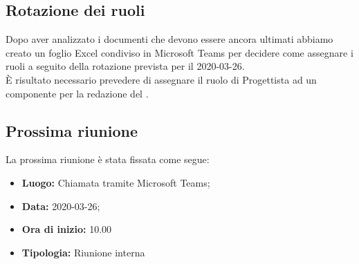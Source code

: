 	\subsection{Rotazione dei ruoli}
		Dopo aver analizzato i documenti che devono essere ancora ultimati abbiamo creato un foglio Excel condiviso in Microsoft Teams per decidere come assegnare i ruoli a seguito della rotazione prevista per il 2020-03-26. \\
		È risultato necessario prevedere di assegnare il ruolo di Progettista ad un componente per la redazione del \PdQ.

	\subsection{Prossima riunione}
		La prossima riunione è stata fissata come segue: 
		\begin{itemize}
			\item \textbf{Luogo: } Chiamata tramite Microsoft Teams; 
			\item \textbf{Data: } 2020-03-26; 
			\item \textbf{Ora di inizio: } 10.00
			\item \textbf{Tipologia: } Riunione interna
		\end{itemize}